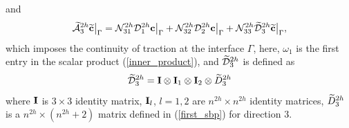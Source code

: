 and
\begin{equation}\label{hatAc}
\wt{\mathcal{A}}_3^{2h}\wt{\bf c}\big|_\Gamma = \mathcal{N}_{31}^{2h}\mathcal{D}^{2h}_1{\bf c}\big|_\Gamma + \mathcal{N}_{32}^{2h}\mathcal{D}^{2h}_2{\bf c}\big|_\Gamma + \mathcal{N}_{33}^{2h}\wt{\mathcal D}^{2h}_3\wt{\bf c}\big|_\Gamma,
\end{equation}
 which imposes the continuity of traction at the interface $\Gamma$, here, $\omega_1$ is the first entry in the scalar product (\ref{inner_product}), and $\widetilde{\mathcal{D}}_3^{2h}$ is defined as
 \[\widetilde{\mathcal{D}}_3^{2h} = {\bf I}\otimes {\bf I}_1 \otimes {\bf I}_2 \otimes \widetilde{D}_3^{2h}\]
 where ${\bf I}$ is $3\times3$ identity matrix, ${\bf I}_l$, $l = 1,2$ are $n^{2h}\times n^{2h}$ identity matrices, $\widetilde{D}_3^{2h}$ is a $n^{2h}\times (n^{2h}+2)$ matrix defined in (\ref{first_sbp}) for direction $3$.

